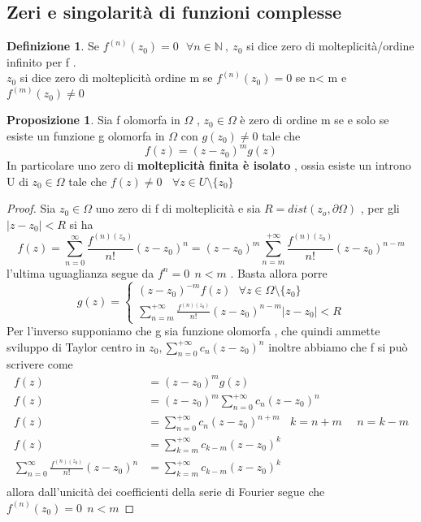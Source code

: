 \documentclass{article}
\theoremstyle{definition}
\newtheorem*{definizione}{Definizione}
\newtheorem*{proposizione}{Proposizione}
\newcommand{\norm}[1]{|#1|}
\begin{document}
	\subsection{Zeri e singolarità di funzioni complesse}
	\begin{definizione}
		Se $f^{(n)}(z_0)=0 \ \ \ \forall n \in \mathbb{N} \ , \ z_0$ si dice zero di molteplicità/ordine infinito per f . \\ $z_0$ si dice zero di molteplicità ordine m se  $f^{(n)}(z_0)= 0$ se n< m e $f^{(m)}(z_0)\neq 0$
	\end{definizione}
	\begin{proposizione}
		Sia f olomorfa in $\Omega$ , $z_0\in \Omega$ è zero di ordine m se e solo se esiste un funzione g olomorfa in $\Omega$ con $g(z_0)\neq 0$ tale che 
		$$f(z)=(z-z_0)^m g(z)$$	
		In particolare uno zero di \textbf{molteplicità finita è isolato } , ossia esiste un introno U di $z_0\in \Omega$ tale che $f(z)\neq 0\ \ \  \ \forall z \in U \setminus \{z_0\} $
		\end{proposizione}
		\begin{proof}
			Sia $z_0 \in \Omega $ uno zero di f di molteplicità e sia $R=dist(z_o,\partial \Omega)$ , per gli $\norm{z-z_0}< R$ si ha 
			$$f(z)=\sum_{n=0}^{\infty}\frac{f^{(n)(z_0)}}{n!}(z-z_0)^n = (z-z_0)^m \sum_{n=m}^{+\infty}\frac{f^{(n)(z_0)}}{n!}(z-z_0)^{n-m}$$ 
		l'ultima uguaglianza segue da $f^{n}=0 \ \ n < m $ . Basta allora porre 
		$$g(z)=\begin{cases}
			(z-z_0)^{-m}f(z) \ \ \ \forall z \in \Omega \setminus \{z_0\} \\
			\sum_{n=m}^{+\infty}\frac{f^{(n)(z_0)}}{n!}(z-z_0)^{n-m} \norm{z-z_0} < R
 		\end{cases}$$
 		Per l'inverso supponiamo che g sia funzione olomorfa , che quindi ammette sviluppo di Taylor centro in $z_0 , \sum_{n=0}^{+\infty}c_n (z-z_0)^n$ inoltre abbiamo che f si può scrivere come 
 		\begin{align*}
 			f(z)&=(z-z_0)^m g(z) \\
 			f(z)&=(z-z_0)^m \sum_{n=0}^{+\infty}c_n(z-z_0)^n\\
 			f(z)&= \sum_{n=0}^{+\infty}c_n(z-z_0)^{n+m} \ \ \ \ k=n+m \ \ \ \ \ \ n=k-m\\
 			f(z) & = \sum_{k=m}^{+\infty}c_{k-m}(z-z_0)^{k} \\
 			\sum_{n=0}^{\infty}\frac{f^{(n)(z_0)}}{n!}(z-z_0)^n & = \sum_{k=m}^{+\infty}c_{k-m}(z-z_0)^{k} \\
 		\end{align*} 		
 		allora dall'unicità dei coefficienti della serie di Fourier segue che $f^{(n)}(z_0)=0 \ \ n<m$
				\end{proof}
\end{document}
